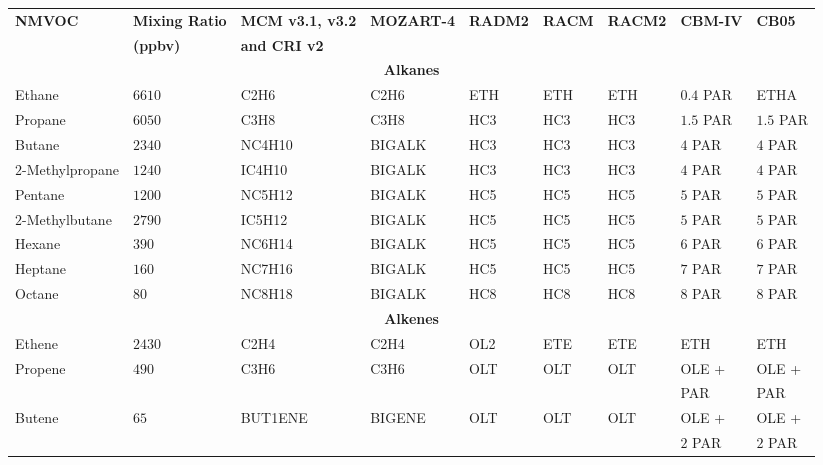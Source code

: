 \begin{table}
    \begin{center}
        \begin{tabular}{lllllllll}
            \hline \hline
            \multirow{2}{*}{\textbf{NMVOC}} & \textbf{Mixing Ratio} & \textbf{MCM v3.1, v3.2} & \multirow{2}{*}{\textbf{MOZART-4}} & \multirow{2}{*}{\textbf{RADM2}} & \multirow{2}{*}{\textbf{RACM}} & \multirow{2}{*}{\textbf{RACM2}} & \multirow{2}{*}{\textbf{CBM-IV}} & \multirow{2}{*}{\textbf{CB05}}\\ & \textbf{(ppbv)} & \textbf{and CRI v2} & & & & & & \\ 
            \hline \hline \multicolumn{9}{c}{\textbf{Alkanes}}  \\ \hline
            Ethane & $6610$ & C2H6 & C2H6 & ETH & ETH & ETH & $0.4$ PAR & ETHA \\
            Propane  & $6050$ & C3H8 & C3H8 & HC3 & HC3 & HC3 & $1.5$ PAR & $1.5$ PAR \\
            Butane & $2340$ & NC4H10 & BIGALK & HC3 & HC3 & HC3 & $4$ PAR & $4$ PAR \\
            $2$-Methylpropane & $1240$ & IC4H10 & BIGALK & HC3 & HC3 & HC3 & $4$ PAR & $4$ PAR \\
            Pentane & $1200$ & NC5H12 & BIGALK & HC5 & HC5 & HC5 & $5$ PAR & $5$ PAR \\
            $2$-Methylbutane & $2790$ & IC5H12 & BIGALK & HC5 & HC5 & HC5 & $5$ PAR & $5$ PAR \\
            Hexane & $390$ & NC6H14 & BIGALK & HC5 & HC5 & HC5 & $6$ PAR & $6$ PAR \\
            Heptane & $160$ & NC7H16 &  BIGALK & HC5 & HC5 & HC5 & $7$ PAR & $7$ PAR \\
            Octane & $80$ & NC8H18 & BIGALK & HC8 & HC8 & HC8 & $8$ PAR & $8$ PAR \\ \hline 
            \multicolumn{9}{c}{\textbf{Alkenes}} \\ \hline
            Ethene & $2430$ & C2H4 & C2H4 & OL2 & ETE & ETE & ETH & ETH \\
            \multirow{2}{*}{Propene} & \multirow{2}{*}{$490$} & \multirow{2}{*}{C3H6} & \multirow{2}{*}{C3H6} & \multirow{2}{*}{OLT} & \multirow{2}{*}{OLT} & \multirow{2}{*}{OLT} & OLE + & OLE + \\ & & & & & & & \hspace{3mm}PAR & \hspace{3mm}PAR \\
            \multirow{2}{*}{Butene} & \multirow{2}{*}{$65$} & \multirow{2}{*}{BUT1ENE} & \multirow{2}{*}{BIGENE} & \multirow{2}{*}{OLT} & \multirow{2}{*}{OLT} & \multirow{2}{*}{OLT} & OLE + & OLE + \\ & & & & & & & \hspace{3mm}$2$ PAR & \hspace{3mm}$2$ PAR \\

\end{tabular}
\end{center}
\end{table}
